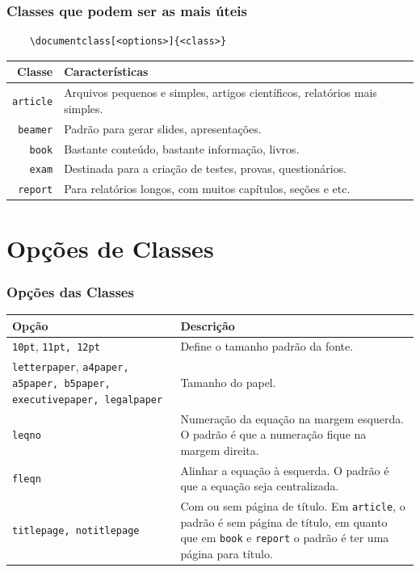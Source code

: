 \documentclass{beamer}
\begin{document}
\begin{frame}[fragile]
    \frametitle{Classes que podem ser as mais úteis}
\begin{lstlisting}
    \documentclass[<options>]{<class>}
\end{lstlisting}
\begin{tabularx}{\textwidth}{rX}
    \hline
    \textbf{Classe} & \textbf{Características} \\ \hline
    \lstinline[]!article! & Arquivos pequenos e simples, artigos científicos, relatórios mais simples. \\ \hline
    \lstinline[]!beamer! & Padrão para gerar slides, apresentações. \\ \hline
    \lstinline[]!book! & Bastante conteúdo, bastante informação, livros. \\ \hline
    \lstinline[]!exam! & Destinada para a criação de testes, provas, questionários. \\ \hline
    \lstinline[]!report! & Para relatórios longos, com muitos capítulos, seções e etc. \\ \hline
\end{tabularx}
\end{frame}

\section{Opções de Classes}

\begin{frame}
    \frametitle{Opções das Classes}
\begin{table}[h]\small
    \begin{tabularx}{\textwidth}{XX}
        \hline
        \textbf{Opção} & \textbf{Descrição} \\ \hline
        \lstinline[basicstyle={\bfseries\footnotesize}]!10pt!, \lstinline[]!11pt, 12pt! & Define o tamanho padrão da fonte. \\ \hline
        \lstinline[basicstyle={\bfseries\footnotesize}]!letterpaper!, \lstinline[]!a4paper, a5paper, b5paper, executivepaper, legalpaper! & Tamanho do papel. \\ \hline
        \lstinline[]!leqno! & Numeração da equação na margem esquerda. O padrão é que a numeração fique na margem direita. \\ \hline
        \lstinline[]!fleqn! & Alinhar a equação à esquerda. O padrão é que a equação seja centralizada. \\ \hline
        \lstinline!titlepage, notitlepage! & Com ou sem página de título. Em \lstinline!article!, o padrão é sem página de título, em quanto que em \lstinline!book! e \lstinline!report! o padrão é ter uma página para título. \\ \hline
    \end{tabularx}
\end{table}
\end{frame}
\end{document}
